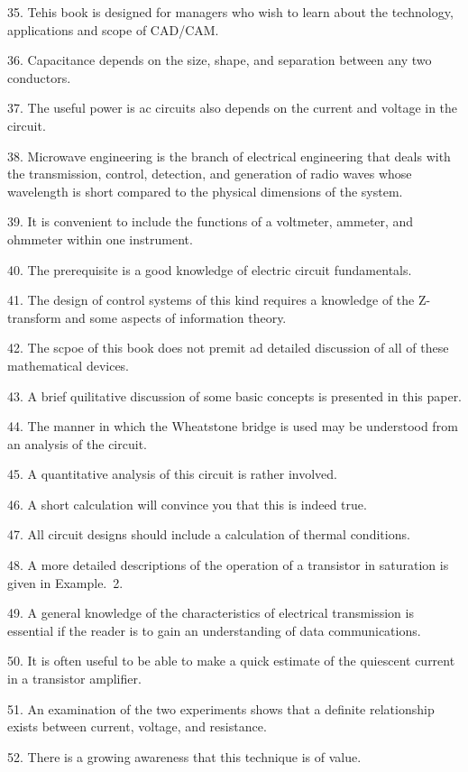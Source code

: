 \documentclass[a4paper,twocolumn,10pt]{article}
\begin{document}
\begin{CJK}{UTF8}{gkai}
	35. Tehis book is designed for managers who wish to learn about the technology,
	applications and scope of CAD/CAM.

	36. Capacitance depends on the size, shape, and separation between any two conductors.

	37. The useful power is ac circuits also depends on the current and voltage in the circuit.

	38. Microwave engineering is the branch of electrical engineering that deals with the
	transmission, control, detection, and generation of radio waves whose wavelength is short
	compared to the physical dimensions of the system.

	39. It is convenient to include the functions of a voltmeter, ammeter, and ohmmeter within
	one instrument.

	40. The prerequisite is a good knowledge of electric circuit fundamentals.

	41. The design of control systems of this kind requires a knowledge of the Z-transform and
	some aspects of information theory.

	42. The scpoe of this book does not premit ad detailed discussion of all of these 
	mathematical devices.

	43. A brief quilitative discussion of some basic concepts is presented in this paper.

	44. The manner in which the Wheatstone bridge is used may be understood from an analysis
	of the circuit.

	45. A quantitative analysis of this circuit is rather involved.

	46. A short calculation will convince you that this is indeed true.

	47. All circuit designs should include a calculation of thermal conditions.

	48. A more detailed descriptions of the operation of a transistor in saturation is given
	in Example.~2.

	49. A general knowledge of the characteristics of electrical transmission is essential if 
	the reader is to gain an understanding of data communications.
	
	50. It is often useful to be able to make a quick estimate of the quiescent current
	in a transistor amplifier.

	51. An examination of the two experiments shows that a definite relationship exists
	between current, voltage, and resistance.

	52. There is a growing awareness that this technique is of value.


\end{CJK}
\end{document}
